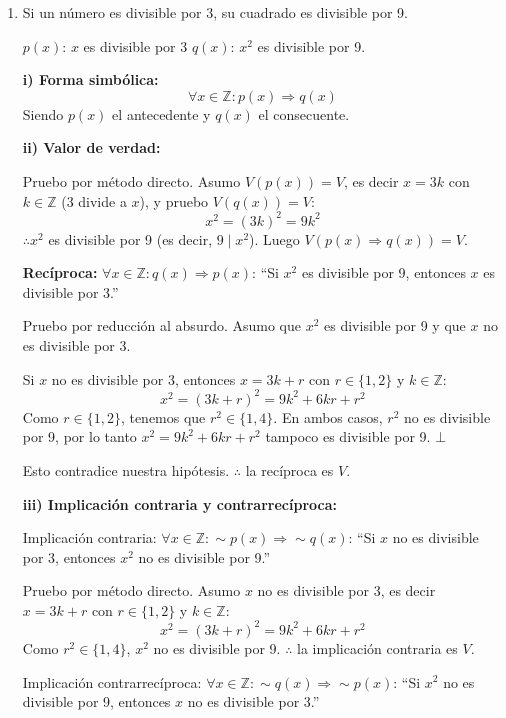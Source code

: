 \documentclass[12pt]{article}
\begin{document}
\begin{enumerate}[label=\alph*.-]
    \textbf{iv)} Dado que $V(p \Rightarrow q) = V$ y $V(q \Rightarrow p) = V$, $p$ es condición \textbf{necesaria y suficiente} para $q$.

    \newpage

    \item Si un número es divisible por 3, su cuadrado es divisible por 9.

    $p(x)$: $x$ es divisible por 3 \quad $q(x)$: $x^2$ es divisible por 9.

    \textbf{i) Forma simbólica:}
    \[\forall x \in \mathbb{Z}: p(x) \Rightarrow q(x)\]
    Siendo $p(x)$ el antecedente y $q(x)$ el consecuente.

    \textbf{ii) Valor de verdad:}

    Pruebo por método directo. Asumo $V(p(x)) = V$, es decir $x = 3k$ con $k \in \mathbb{Z}$ (3 divide a $x$), y pruebo $V(q(x)) = V$:
    \[x^2 = (3k)^2 = 9k^2\]
    $\therefore x^2$ es divisible por 9 (es decir, $9 \mid x^2$). Luego $V(p(x) \Rightarrow q(x)) = V$.

    \textbf{Recíproca:} $\forall x \in \mathbb{Z}: q(x) \Rightarrow p(x)$: ``Si $x^2$ es divisible por 9, entonces $x$ es divisible por 3.''

    Pruebo por reducción al absurdo. Asumo que $x^2$ es divisible por 9 y que $x$ no es divisible por 3. 
    
    Si $x$ no es divisible por 3, entonces $x = 3k + r$ con $r \in \{1, 2\}$ y $k \in \mathbb{Z}$:
    \[x^2 = (3k+r)^2 = 9k^2 + 6kr + r^2\]
    Como $r \in \{1,2\}$, tenemos que $r^2 \in \{1, 4\}$. En ambos casos, $r^2$ no es divisible por 9, por lo tanto $x^2 = 9k^2 + 6kr + r^2$ tampoco es divisible por 9. $\bot$ 
    
    Esto contradice nuestra hipótesis. $\therefore$ la recíproca es $V$.

    \textbf{iii) Implicación contraria y contrarrecíproca:}

    Implicación contraria: $\forall x \in \mathbb{Z}: \sim p(x) \Rightarrow \sim q(x)$: ``Si $x$ no es divisible por 3, entonces $x^2$ no es divisible por 9.''

    Pruebo por método directo. Asumo $x$ no es divisible por 3, es decir $x = 3k + r$ con $r \in \{1, 2\}$ y $k \in \mathbb{Z}$:
    \[x^2 = (3k+r)^2 = 9k^2 + 6kr + r^2\]
    Como $r^2 \in \{1, 4\}$, $x^2$ no es divisible por 9. $\therefore$ la implicación contraria es $V$.

    Implicación contrarrecíproca: $\forall x \in \mathbb{Z}: \sim q(x) \Rightarrow \sim p(x)$: ``Si $x^2$ no es divisible por 9, entonces $x$ no es divisible por 3.''


\end{enumerate}
\end{document}
